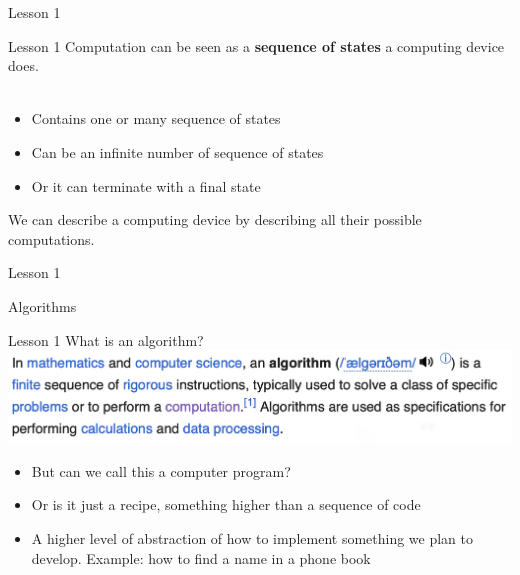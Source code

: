 \documentclass[aspectratio=1610]{beamer}
\begin{document}
\begin{frame}{Lesson 1}{}
\end{frame}



\begin{frame}{Lesson 1}{}
\Large
Computation can be seen as a \textbf{sequence of states} a computing device does.\\~\\
\Large{
\begin{itemize}
    \item Contains one or many sequence of states
    \item Can be an infinite number of sequence of states
    \item Or it can terminate with a final state
 \end{itemize}}
    
 We can describe a computing device by describing all their possible computations.

\end{frame}



\begin{frame}{Lesson 1}{}
\begin{center}
\Huge Algorithms
\end{center}
\end{frame}

\begin{frame}{Lesson 1}{}
{\Huge{What is an algorithm?}}
\includegraphics[scale=0.33]{Images/algorithm.png}

\Large{
\begin{itemize}
    \item But can we call this a \alert{computer program}?
    \item Or is it just a recipe, something higher than a \alert{sequence of code}
    \item A higher level of abstraction of how to implement something we plan to develop. Example: how to find a name in a phone book
\end{itemize}}

\end{frame}
\end{document}
